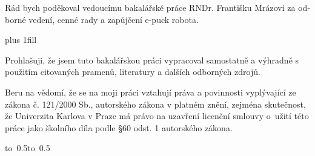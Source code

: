 \newpage



\openright

\noindent
\begin{otherlanguage}{czech}
Rád bych poděkoval vedoucímu bakalářské práce RNDr. Františku Mrázovi za
odborné vedení, cenné rady a zapůjčení e-puck robota.
\end{otherlanguage}

\newpage


\vglue 0pt plus 1fill

\noindent
Prohlašuji, že jsem tuto bakalářskou práci vypracoval samostatně a výhradně s
použitím citovaných pramenů, literatury a dalších odborných zdrojů.

\medskip\noindent
Beru na vědomí, že se na moji práci vztahují práva a povinnosti vyplývající ze
zákona č. 121/2000 Sb., autorského zákona v platném znění, zejména skutečnost,
že Univerzita Karlova v Praze má právo na uzavření licenční smlouvy o~užití
této práce jako školního díla podle \S 60 odst. 1 autorského zákona.

\vspace{10mm}

\hbox{\hbox to 0.5\hbox to 0.5}

\vspace{20mm}
\newpage


